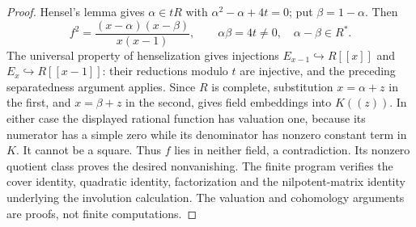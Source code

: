 \begin{proof}
Hensel's lemma gives $\alpha\in tR$ with $\alpha^2-\alpha+4t=0$; put $\beta=1-\alpha$. Then
\[
 f^2=\frac{(x-\alpha)(x-\beta)}{x(x-1)},
 \qquad \alpha\beta=4t\ne0,\quad \alpha-\beta\in R^*.
\]
The universal property of henselization gives injections $E_{x-1}\hookrightarrow R[[x]]$ and $E_x\hookrightarrow R[[x-1]]$: their reductions modulo $t$ are injective, and the preceding separatedness argument applies. Since $R$ is complete, substitution $x=\alpha+z$ in the first, and $x=\beta+z$ in the second, gives field embeddings into $K((z))$. In either case the displayed rational function has valuation one, because its numerator has a simple zero while its denominator has nonzero constant term in $K$. It cannot be a square. Thus $f$ lies in neither field, a contradiction. Its nonzero quotient class proves the desired nonvanishing. The finite program verifies the cover identity, quadratic identity, factorization and the nilpotent-matrix identity underlying the involution calculation. The valuation and cohomology arguments are proofs, not finite computations.
\end{proof}

